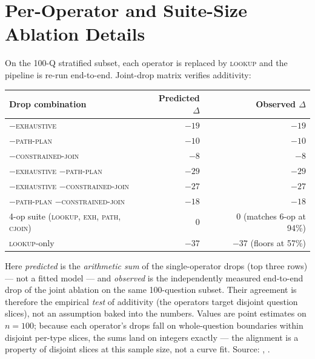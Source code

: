 \documentclass[review]{elsarticle}
\newcommand{\op}[1]{\textsc{\small #1}}
\begin{document}
\section{Per-Operator and Suite-Size Ablation Details}
\label{app:ablation}

On the 100-Q stratified subset, each operator is replaced by \op{lookup} and the pipeline is re-run end-to-end. Joint-drop matrix verifies additivity:

\begin{table}[h]
\centering
\small
\begin{tabular}{l r r}
\toprule
\textbf{Drop combination} & \textbf{Predicted $\Delta$} & \textbf{Observed $\Delta$} \\
\midrule
$-$\op{exhaustive}                                              & $-19$ & $-19$ \\
$-$\op{path-plan}                                               & $-10$ & $-10$ \\
$-$\op{constrained-join}                                        & $-8$  & $-8$  \\
$-$\op{exhaustive} $-$\op{path-plan}                            & $-29$ & $-29$ \\
$-$\op{exhaustive} $-$\op{constrained-join}                     & $-27$ & $-27$ \\
$-$\op{path-plan} $-$\op{constrained-join}                      & $-18$ & $-18$ \\
4-op suite (\op{lookup}, \op{exh}, \op{path}, \op{cjoin})       & $\phantom{-}0$ & $\phantom{-}0$ (matches 6-op at 94\%) \\
\op{lookup}-only                                                & $-37$ & $-37$ (floors at 57\%) \\
\bottomrule
\end{tabular}
\end{table}

Here \emph{predicted} is the \emph{arithmetic sum} of the single-operator drops (top three rows) --- not a fitted model --- and \emph{observed} is the independently measured end-to-end drop of the joint ablation on the same 100-question subset. Their agreement is therefore the empirical \emph{test} of additivity (the operators target disjoint question slices), not an assumption baked into the numbers. Values are point estimates on $n{=}100$; because each operator's drops fall on whole-question boundaries within disjoint per-type slices, the sums land on integers exactly --- the alignment is a property of disjoint slices at this sample size, not a curve fit. Source: , .
\end{document}
